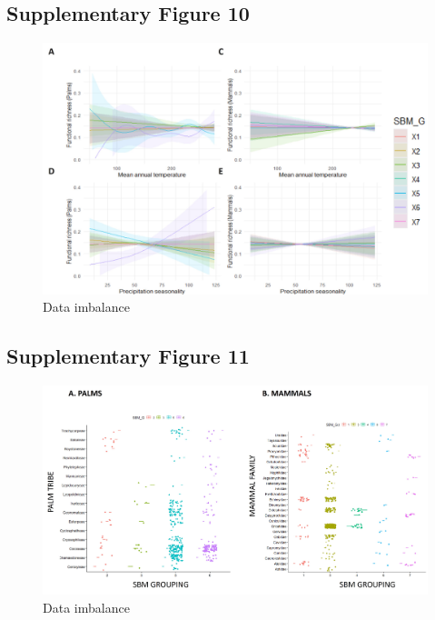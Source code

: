 \documentclass[
]{agujournal2019}
\begin{document}
\subsection{Supplementary Figure 10}

\begin{figure}[H]

{\centering \includegraphics[width=5.67708in,height=\textheight,keepaspectratio]{sup_figures/fr_model_predictions.jpg}

}

\caption{Data imbalance}

\end{figure}%

\subsection{Supplementary Figure 11}

\begin{figure}[H]

{\centering \includegraphics[width=5.67708in,height=\textheight,keepaspectratio]{sup_figures/sup_SBM_taxonomy.jpg}

}

\caption{Data imbalance}

\end{figure}%
\end{document}
